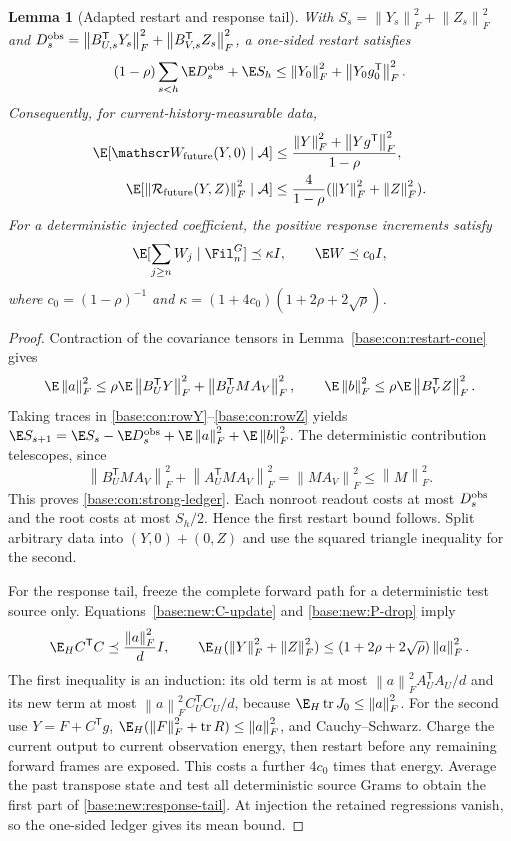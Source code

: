 \documentclass[11pt,oneside,openany,a4paper]{book}
\numberwithin{equation}{chapter}
\newtheorem{lemma}[theorem]{Lemma}
\theoremstyle{definition}
\theoremstyle{remark}
\newcommand{\T}{\mathsf T}\newcommand{\Id}{I}
\newcommand{\F}[1]{\left\lVert#1\right\rVert_F}
\DeclareMathOperator{\tr}{tr}\DeclareMathOperator{\rank}{rank}
\begin{document}
\begin{lemma}[Adapted restart and response tail]\label{base:new:restart}
With $S_s=\F{Y_s}^2+\F{Z_s}^2$ and
$D_s^{\rm obs}=\F{B_{U,s}^\T Y_s}^2+\F{B_{V,s}^\T Z_s}^2$, a one-sided restart satisfies
\begin{equation}\label{base:con:strong-ledger}
 (1-\rho)\sum_{s<h}\E D_s^{\rm obs}+\E S_h
 \le\F{Y_0}^2+\F{Y_0g_0^\T}^2.
\end{equation}
Consequently, for current-history-measurable data,
\begin{align}
 \E[\mathscr W_{\rm future}(Y,0)\mid\mathcal A]
 &\le\frac{\F Y^2+\F{Yg^\T}^2}{1-\rho},\label{base:new:restart-one}\\
 \E[\F{\mathcal R_{\rm future}(Y,Z)}^2\mid\mathcal A]
 &\le\frac4{1-\rho}(\F Y^2+\F Z^2).\label{base:new:restart-two}
\end{align}
For a deterministic injected coefficient, the positive response increments satisfy
\begin{equation}\label{base:new:response-tail}
 \E[\sum_{j\ge n}W_j\mid\Fil_n^G]\preceq\kappa I,
 \qquad \E W\preceq c_0I,
\end{equation}
where $c_0=(1-\rho)^{-1}$ and
$\kappa=(1+4c_0)(1+2\rho+2\sqrt\rho)$.
\end{lemma}
\begin{proof}
Contraction of the covariance tensors in Lemma~\ref{base:con:restart-cone} gives
\[
 \E\F a^2\le\rho\E\F{B_U^\T Y}^2+\F{B_U^\T MA_V}^2,
 \qquad \E\F b^2\le\rho\E\F{B_V^\T Z}^2.
\]
Taking traces in \eqref{base:con:rowY}--\eqref{base:con:rowZ} yields
$\E S_{s+1}=\E S_s-\E D_s^{\rm obs}+\E\F a^2+\E\F b^2$.
The deterministic contribution telescopes, since
\[
 \F{B_U^\T MA_V}^2+\F{A_U^\T MA_V}^2
 =\F{MA_V}^2\le\F M^2.
\]
This proves \eqref{base:con:strong-ledger}. Each nonroot readout costs at most $D_s^{\rm obs}$ and the root costs at most $S_h/2$. Hence the first restart bound follows. Split arbitrary data into $(Y,0)+(0,Z)$ and use the squared triangle inequality for the second.

For the response tail, freeze the complete forward path for a deterministic test source only. Equations~\eqref{base:new:C-update} and \eqref{base:new:P-drop} imply
\[
 \E_H C^\T C\preceq\frac{\F a^2}{d}I,
 \qquad \E_H(\F Y^2+\F Z^2)
 \le(1+2\rho+2\sqrt\rho)\F a^2.
\]
The first inequality is an induction: its old term is at most
$\F a^2 A_U^\T A_U/d$ and its new term at most
$\F a^2 C_U^\T C_U/d$, because $\E_H\tr J_0\le\F a^2$.
For the second use $Y=F+C^\T g$, $\E_H(\F F^2+\tr R)\le\F a^2$, and Cauchy--Schwarz. Charge the current output to current observation energy, then restart before any remaining forward frames are exposed. This costs a further $4c_0$ times that energy. Average the past transpose state and test all deterministic source Grams to obtain the first part of \eqref{base:new:response-tail}. At injection the retained regressions vanish, so the one-sided ledger gives its mean bound.
\end{proof}
\end{document}
